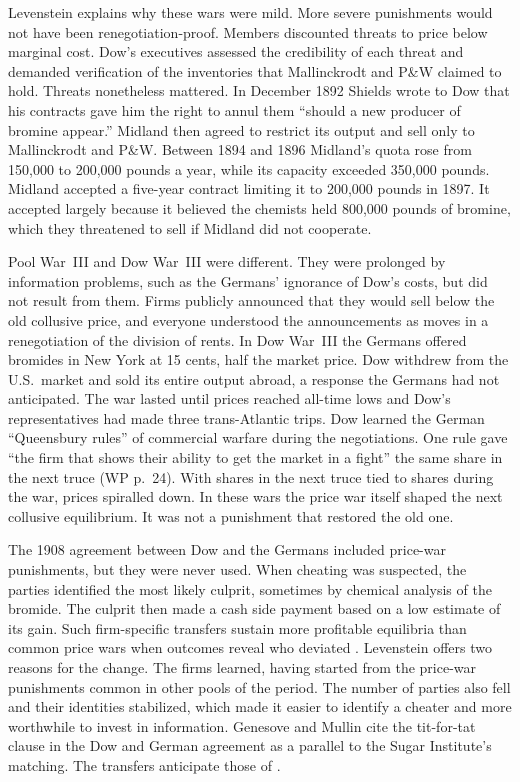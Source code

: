Levenstein explains why these wars were mild. More severe punishments would not have been renegotiation-proof.
Members discounted threats to price below marginal cost. Dow's executives assessed the credibility of each threat
and demanded verification of the inventories that Mallinckrodt and P\&W claimed to hold. Threats nonetheless
mattered. In December 1892 Shields wrote to Dow that his contracts gave him the right to annul them ``should a new
producer of bromine appear.'' Midland then agreed to restrict its output and sell only to Mallinckrodt and P\&W.
Between 1894 and 1896 Midland's quota rose from 150,000 to 200,000 pounds a year, while its capacity exceeded
350,000 pounds. Midland accepted a five-year contract limiting it to 200,000 pounds in 1897. It accepted
largely because it believed the chemists held 800,000 pounds of bromine, which they threatened to sell if Midland
did not cooperate.

Pool War~III and Dow War~III were different. They were prolonged by information problems, such as the Germans'
ignorance of Dow's costs, but did not result from them. Firms publicly announced that they would sell below the
old collusive price, and everyone understood the announcements as moves in a renegotiation of the division of
rents. In Dow War~III the Germans offered bromides in New York at 15 cents, half the market price. Dow withdrew
from the U.S.\ market and sold its entire output abroad, a response the Germans had not anticipated. The war
lasted until prices reached all-time lows and Dow's representatives had made three trans-Atlantic trips. Dow
learned the German ``Queensbury rules'' of commercial warfare during the negotiations. One rule gave ``the firm that
shows their ability to get the market in a fight'' the same share in the next truce (WP p.~24). With shares in the next truce tied to shares during the war, prices spiralled down. In
these wars the price war itself shaped the next collusive equilibrium. It was not a punishment that restored the
old one.

The 1908 agreement between Dow and the Germans included price-war punishments, but they were never used. When
cheating was suspected, the parties identified the most likely culprit, sometimes by chemical analysis of the
bromide. The culprit then made a cash side payment based on a low estimate of its gain. Such firm-specific
transfers sustain more profitable equilibria than common price wars when outcomes reveal who deviated
\citep{AbreuPearceStacchetti1990,FudenbergLevineMaskin1994}. Levenstein offers two reasons for the change. The
firms learned, having started from the price-war punishments common in other pools of the period. The number of
parties also fell and their identities stabilized, which made it easier to identify a cheater and more worthwhile
to invest in information. Genesove and Mullin cite the tit-for-tat clause in the Dow and German agreement as a
parallel to the Sugar Institute's matching. The transfers anticipate those of \citet{HarringtonSkrzypacz2011}.

